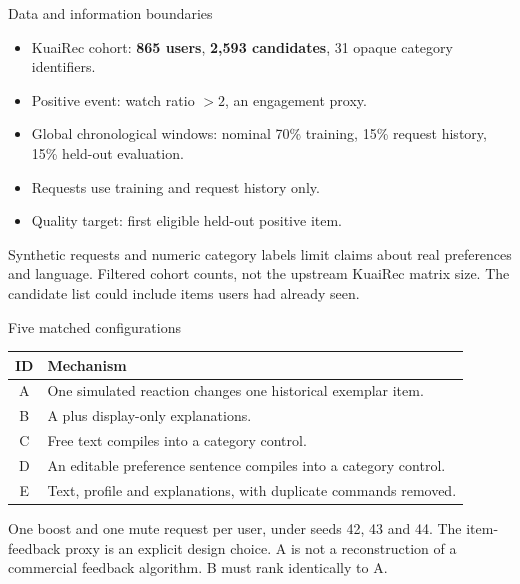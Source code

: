 \documentclass[10pt]{beamer}
\newcommand{\toprule}{\hline}
\newcommand{\midrule}{\hline}
\newcommand{\bottomrule}{\hline}
\newcommand{\src}[1]{\vfill{\tiny\color{bcitgray}#1}}
\begin{document}
\begin{frame}{Data and information boundaries}
\begin{itemize}
\item KuaiRec cohort: \textbf{865 users}, \textbf{2,593 candidates}, 31 opaque category identifiers.
\item Positive event: watch ratio $>2$, an engagement proxy.
\item Global chronological windows: nominal 70\% training, 15\% request history, 15\% held-out evaluation.
\item Requests use training and request history only.
\item Quality target: first eligible held-out positive item.
\end{itemize}
\vspace{0.2cm}
Synthetic requests and numeric category labels limit claims about real preferences and language.
\src{Filtered cohort counts, not the upstream KuaiRec matrix size. The candidate list could include items users had already seen.}
\end{frame}

\begin{frame}{Five matched configurations}
\small
\begin{tabular}{@{}cP{8.9cm}@{}}
\toprule
ID & Mechanism\\\midrule
A & One simulated reaction changes one historical exemplar item.\\[0.15cm]
B & A plus display-only explanations.\\[0.15cm]
C & Free text compiles into a category control.\\[0.15cm]
D & An editable preference sentence compiles into a category control.\\[0.15cm]
E & Text, profile and explanations, with duplicate commands removed.\\\bottomrule
\end{tabular}\par
\vspace{0.25cm}
One boost and one mute request per user, under seeds 42, 43 and 44. The item-feedback proxy is an explicit design choice.
\src{A is not a reconstruction of a commercial feedback algorithm. B must rank identically to A.}
\end{frame}
\end{document}
